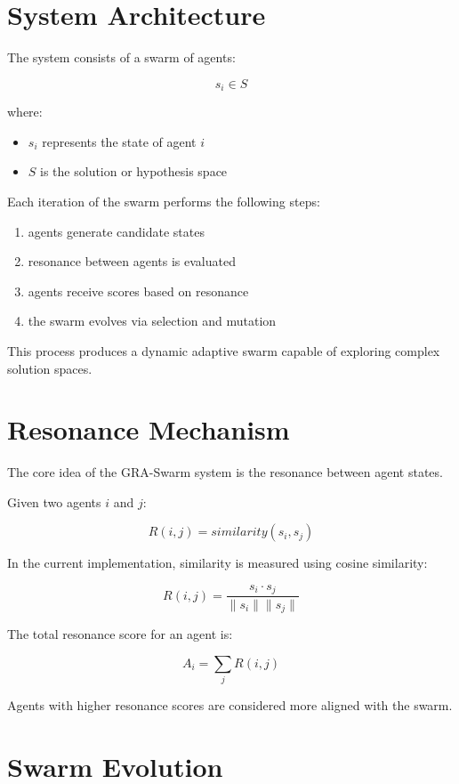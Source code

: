 \documentclass[11pt]{article}
\begin{document}
\section{System Architecture}

The system consists of a swarm of agents:

\[
s_i \in S
\]

where:

\begin{itemize}
\item \(s_i\) represents the state of agent \(i\)
\item \(S\) is the solution or hypothesis space
\end{itemize}

Each iteration of the swarm performs the following steps:

\begin{enumerate}
\item agents generate candidate states
\item resonance between agents is evaluated
\item agents receive scores based on resonance
\item the swarm evolves via selection and mutation
\end{enumerate}

This process produces a dynamic adaptive swarm capable of exploring complex solution spaces.

\section{Resonance Mechanism}

The core idea of the GRA-Swarm system is the resonance between agent states.

Given two agents \(i\) and \(j\):

\[
R(i,j) = similarity(s_i, s_j)
\]

In the current implementation, similarity is measured using cosine similarity:

\[
R(i,j) =
\frac{s_i \cdot s_j}
{\|s_i\| \|s_j\|}
\]

The total resonance score for an agent is:

\[
A_i = \sum_{j} R(i,j)
\]

Agents with higher resonance scores are considered more aligned with the swarm.

\section{Swarm Evolution}
\end{document}
